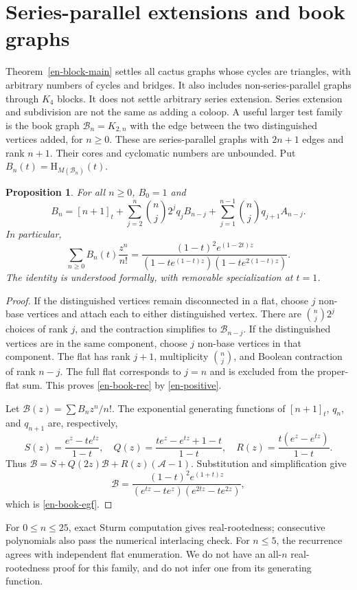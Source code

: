\documentclass[12pt]{amsart}
\newtheorem{prop}[thm]{Proposition}
\theoremstyle{definition}
\theoremstyle{remark}
\numberwithin{equation}{section}
\newcommand{\HCh}{\mathrm{H}}
\begin{document}
\section{Series-parallel extensions and book graphs}
Theorem~\ref{en-block-main} settles all cactus graphs whose cycles are triangles, with arbitrary numbers of cycles and bridges. It also includes non-series-parallel graphs through $K_4$ blocks. It does not settle arbitrary series extension. Series extension and subdivision are not the same as adding a coloop. A useful larger test family is the book graph $\mathcal B_n=K_{2,n}$ with the edge between the two distinguished vertices added, for $n\geq0$. These are series-parallel graphs with $2n+1$ edges and rank $n+1$. Their cores and cyclomatic numbers are unbounded. Put $B_n(t)=\HCh_{M(\mathcal B_n)}(t)$.

\begin{samepage}
\begin{prop}\label{en-book}
For all $n\geq0$, $B_0=1$ and
\begin{equation}\label{en-book-rec}
 B_n=[n+1]_t+
 \sum_{j=2}^{n}\binom nj2^jq_jB_{n-j}
 +\sum_{j=1}^{n-1}\binom njq_{j+1}A_{n-j}.
\end{equation}
In particular,
\begin{equation}\label{en-book-egf}
 \sum_{n\geq0}B_n(t)\frac{z^n}{n!}
 =\frac{(1-t)^2e^{(1-2t)z}}
 {(1-te^{(1-t)z})(1-te^{2(1-t)z})}.
\end{equation}
The identity is understood formally, with removable specialization at $t=1$.
\end{prop}
\end{samepage}
\begin{proof}
If the distinguished vertices remain disconnected in a flat, choose $j$ non-base vertices and attach each to either distinguished vertex. There are $\binom nj2^j$ choices of rank $j$, and the contraction simplifies to $\mathcal B_{n-j}$. If the distinguished vertices are in the same component, choose $j$ non-base vertices in that component. The flat has rank $j+1$, multiplicity $\binom nj$, and Boolean contraction of rank $n-j$. The full flat corresponds to $j=n$ and is excluded from the proper-flat sum. This proves \eqref{en-book-rec} by \eqref{en-positive}.

Let $\mathcal B(z)=\sum B_nz^n/n!$. The exponential generating functions of $[n+1]_t$, $q_n$, and $q_{n+1}$ are, respectively,
\[
 S(z)=\frac{e^z-te^{tz}}{1-t},\quad
 Q(z)=\frac{te^z-e^{tz}+1-t}{1-t},\quad
 R(z)=\frac{t(e^z-e^{tz})}{1-t}.
\]
Thus $\mathcal B=S+Q(2z)\mathcal B+R(z)(\mathcal A-1)$. Substitution and simplification give
\[
 \mathcal B=\frac{(1-t)^2e^{(1+t)z}}
 {(e^{tz}-te^z)(e^{2tz}-te^{2z})},
\]
which is \eqref{en-book-egf}.
\end{proof}
For $0\leq n\leq25$, exact Sturm computation gives real-rootedness; consecutive polynomials also pass the numerical interlacing check. For $n\leq5$, the recurrence agrees with independent flat enumeration. We do not have an all-$n$ real-rootedness proof for this family, and do not infer one from its generating function.
\end{document}
